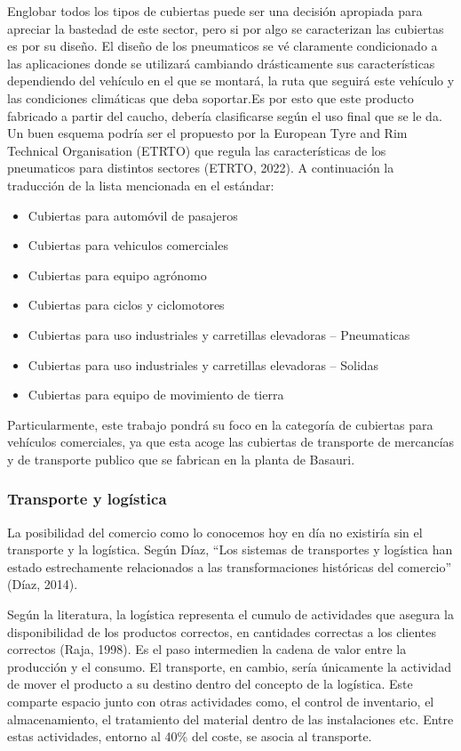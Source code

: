 Englobar todos los tipos de cubiertas puede ser una decisión apropiada para apreciar la bastedad de este sector, pero si por algo se caracterizan las cubiertas es por su diseño. El diseño de los pneumaticos se vé claramente condicionado a las aplicaciones donde se utilizará cambiando drásticamente sus características dependiendo del vehículo en el que se montará, la ruta que seguirá este vehículo y las condiciones climáticas que deba soportar.Es por esto que este producto fabricado a partir del caucho, debería clasificarse según el uso final que se le da. Un buen esquema podría ser el propuesto por la European Tyre and Rim Technical Organisation (ETRTO) que regula las características de los pneumaticos para distintos sectores (ETRTO, 2022). A continuación la traducción de la lista mencionada en el estándar:

\begin{itemize}
	\item Cubiertas para automóvil de pasajeros
	\item Cubiertas para vehiculos comerciales
	\item Cubiertas para equipo agrónomo
	\item Cubiertas para ciclos y ciclomotores
	\item Cubiertas para uso industriales y carretillas elevadoras – Pneumaticas
	\item Cubiertas para uso industriales y  carretillas elevadoras – Solidas
	\item Cubiertas para equipo de movimiento de tierra

\end{itemize}

Particularmente, este trabajo pondrá su foco en la categoría de cubiertas para vehículos comerciales, ya que esta acoge las cubiertas de transporte de mercancías y de transporte publico que se fabrican en la planta de Basauri.

\subsubsection{Transporte y logística}

La posibilidad del comercio como lo conocemos hoy en día no existiría sin el transporte y la logística. Según Díaz, “Los sistemas de transportes y logística han estado estrechamente relacionados a las transformaciones históricas del comercio” (Díaz, 2014).

Según la literatura, la logística representa el cumulo de actividades que asegura la disponibilidad de los productos correctos, en cantidades correctas a los clientes correctos (Raja, 1998). Es el paso intermedien la cadena de valor entre la producción y el consumo. El transporte, en cambio, sería únicamente la actividad de mover el producto a su destino dentro del concepto de la logística. Este comparte espacio junto con otras actividades como, el control de inventario, el almacenamiento, el tratamiento del material dentro de las instalaciones etc. Entre estas actividades, entorno al 40\% del coste, se asocia al transporte.

